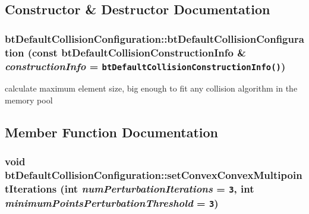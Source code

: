\subsection{Constructor \& Destructor Documentation}
\hypertarget{classbt_default_collision_configuration_d08e7d72b0bd0d3f98290c2a1649b0d9}{
\subsubsection[btDefaultCollisionConfiguration]{\setlength{\rightskip}{0pt plus 5cm}btDefaultCollisionConfiguration::btDefaultCollisionConfiguration (const btDefaultCollisionConstructionInfo \& {\em constructionInfo} = {\tt btDefaultCollisionConstructionInfo()})}}
\label{classbt_default_collision_configuration_d08e7d72b0bd0d3f98290c2a1649b0d9}




calculate maximum element size, big enough to fit any collision algorithm in the memory pool 

\subsection{Member Function Documentation}
\hypertarget{classbt_default_collision_configuration_39a173eedf0e8d55dd89ef3b637925a9}{
\subsubsection[setConvexConvexMultipointIterations]{\setlength{\rightskip}{0pt plus 5cm}void btDefaultCollisionConfiguration::setConvexConvexMultipointIterations (int {\em numPerturbationIterations} = {\tt 3}, \/  int {\em minimumPointsPerturbationThreshold} = {\tt 3})}}
\label{classbt_default_collision_configuration_39a173eedf0e8d55dd89ef3b637925a9}


